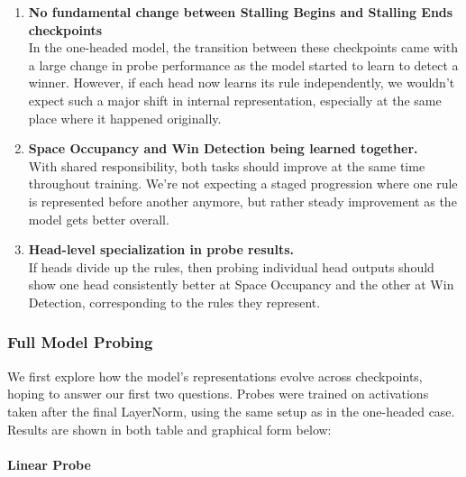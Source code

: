 \documentclass[11pt]{article}
\begin{document}
\begin{enumerate}
\def\labelenumi{\arabic{enumi}.}
\item
  \textbf{No fundamental change between Stalling Begins and Stalling
  Ends checkpoints}\\
  In the one-headed model, the transition between these checkpoints came
  with a large change in probe performance as the model started to learn
  to detect a winner. However, if each head now learns its rule
  independently, we wouldn't expect such a major shift in internal
  representation, especially at the same place where it happened
  originally.
\item
  \textbf{Space Occupancy and Win Detection being learned together.}\\
  With shared responsibility, both tasks should improve at the same time
  throughout training. We're not expecting a staged progression where
  one rule is represented before another anymore, but rather steady
  improvement as the model gets better overall.
\item
  \textbf{Head-level specialization in probe results.}\\
  If heads divide up the rules, then probing individual head outputs
  should show one head consistently better at Space Occupancy and the
  other at Win Detection, corresponding to the rules they represent.
\end{enumerate}

    \subsubsection{Full Model Probing}\label{full-model-probing}

We first explore how the model's representations evolve across
checkpoints, hoping to answer our first two questions. Probes were
trained on activations taken after the final LayerNorm, using the same
setup as in the one-headed case. Results are shown in both table and
graphical form below:

\paragraph{Linear Probe}\label{linear-probe}
\end{document}
